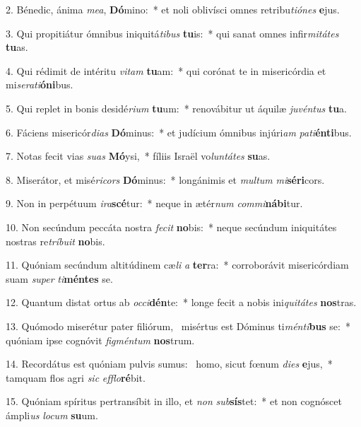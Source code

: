 2. Bénedic, ánima \textit{me}\textit{a}, \textbf{Dó}mino:~*  et noli oblivísci omnes retribu\textit{ti}\textit{ó}\textit{nes} \textbf{e}jus.\

3. Qui propitiátur ómnibus iniquitá\textit{ti}\textit{bus} \textbf{tu}is:~*  qui sanat omnes infir\textit{mi}\textit{tá}\textit{tes} \textbf{tu}as.\

4. Qui rédimit de intéritu \textit{vi}\textit{tam} \textbf{tu}am:~*  qui corónat te in misericórdia et mi\textit{se}\textit{ra}\textit{ti}\textbf{ó}\textbf{ni}bus.\

5. Qui replet in bonis desidé\textit{ri}\textit{um} \textbf{tu}um:~*  renovábitur ut áquilæ \textit{ju}\textit{vén}\textit{tus} \textbf{tu}a.\

6. Fáciens misericór\textit{di}\textit{as} \textbf{Dó}minus:~*  et judícium ómnibus injúri\textit{am} \textit{pa}\textit{ti}\textbf{én}\textbf{ti}bus.\

7. Notas fecit vias \textit{su}\textit{as} \textbf{Mó}ysi,~*  fíliis Israël vo\textit{lun}\textit{tá}\textit{tes} \textbf{su}as.\

8. Miserátor, et misé\textit{ri}\textit{cors} \textbf{Dó}minus:~*  longánimis et \textit{mul}\textit{tum} \textit{mi}\textbf{sé}\textbf{ri}cors.\

9. Non in perpétuum \textit{i}\textit{ra}\textbf{scé}tur:~*  neque in ætér\textit{num} \textit{com}\textit{mi}\textbf{ná}\textbf{bi}tur.\

10. Non secúndum peccáta nostra \textit{fe}\textit{cit} \textbf{no}bis:~*  neque secúndum iniquitátes nostras re\textit{trí}\textit{bu}\textit{it} \textbf{no}bis.\

11. Quóniam secúndum altitúdinem cæ\textit{li} \textit{a} \textbf{ter}ra:~*  corroborávit misericórdiam suam \textit{su}\textit{per} \textit{ti}\textbf{mén}\textbf{tes} se.\

12. Quantum distat ortus ab \textit{oc}\textit{ci}\textbf{dén}te:~*  longe fecit a nobis ini\textit{qui}\textit{tá}\textit{tes} \textbf{nos}tras.\

13. Quómodo miserétur pater filiórum, \dag\  misértus est Dóminus ti\textit{mén}\textit{ti}\textbf{bus} se:~*  quóniam ipse cognóvit \textit{fig}\textit{mén}\textit{tum} \textbf{nos}trum.\

14. Recordátus est quóniam pulvis sumus: \dag\  homo, sicut fœnum \textit{di}\textit{es} \textbf{e}jus,~*  tamquam flos agri \textit{sic} \textit{ef}\textit{flo}\textbf{ré}bit.\

15. Quóniam spíritus pertransíbit in illo, et \textit{non} \textit{sub}\textbf{sís}tet:~*  et non cognóscet ámpli\textit{us} \textit{lo}\textit{cum} \textbf{su}um.\

